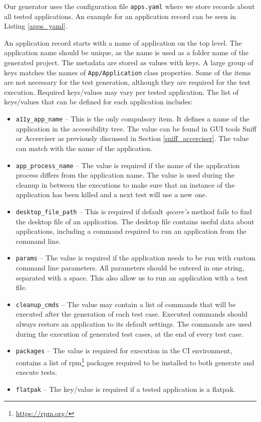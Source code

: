 Our generator uses the configuration file \texttt{apps.yaml} where we store records about all tested applications. An example for an application record can be seen in Listing \ref{apps_yaml}. 



An application record starts with a name of application on the top level. The application name should be unique, as the name is used as a folder name of the generated project. The metadata are stored as values with keys. A large group of keys matches the names of \texttt{App/Application} class properties. Some of the items are not necessary for the test generation, although they are required for the test execution. Required keys/values may vary per tested application. The list of keys/values that can be defined for each application includes:

\begin{itemize}
    \item \texttt{a11y\_app\_name} -- This is the only compulsory item. It defines a name of the application in the accessibility tree. The value can be found in GUI tools Sniff or Accerciser as previously discussed in Section \ref{sniff_accerciser}. The value can match with the name of the application.
     \item \texttt{app\_process\_name} -- The value is required if the name of the application process differs from the application name. The value is used during the cleanup in between the executions to make sure that an instance of the application has been killed and a next test will use a new one.
     \item \texttt{desktop\_file\_path} -- This is required if default \textit{qecore's} method fails to find the desktop file of an application. The desktop file contains useful data about applications, including a command required to run an application from the command line.
     \item \texttt{params} --  The value is required if the application needs to be run with custom command line parameters. All parameters should be entered in one string, separated with a space. This also allow us to run an application with a test file. 
     \item \texttt{cleanup\_cmds} -- The value may contain a list of commands that will be executed after the generation of each test case. Executed commands should always restore an application to its default settings. The commands are used during the execution of generated test cases, at the end of every test case. 
     \item \texttt{packages} -- The value is required for execution in the CI environment, contains a list of rpm\footnote{\url{https://rpm.org/}} packages required to be installed to both generate and execute tests.
     \item \texttt{flatpak} -- The key/value is required if a tested application is a flatpak.
\end{itemize}

